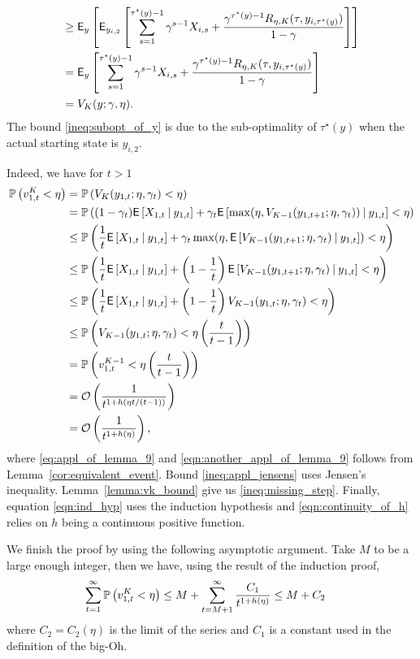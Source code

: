 \begin{myproof}[Proof.]
\begin{myproof}[Proof.]
\begin{align}
		& \ge  \E_y\left[\E_{y_{i,2}}\left[\sum_{s=1}^{\tau^\star(y)-1} \gamma^{s-1} X_{i,s} + \frac{\gamma^{\tau^\star(y)-1} R_{\eta, K}(\tau, y_{i,\tau^\star(y)})}{1-\gamma}\right] \right] \label{ineq:subopt_of_y}\\
		& = \E_y\left[\sum_{s=1}^{\tau^\star(y)-1} \gamma^{s-1} X_{i,s} + \frac{\gamma^{\tau^\star(y)-1} R_{\eta, K}(\tau, y_{i,\tau^\star(y)})}{1-\gamma}\right] \nonumber \\
		& = V_K(y; \gamma, \eta). \nonumber
		\end{align}
		The bound \eqref{ineq:subopt_of_y} is due to the sub-optimality of $\tau^\star(y)$ when the actual starting state is $y_{i,2}$.
	\end{myproof}
	Indeed, we have for $t > 1$
	\begin{align}
	\P{v^K_{1,t} < \eta} & = \P{V_K(y_{1,t}; \eta, \gamma_t) < \eta} \label{eq:appl_of_lemma_9}\\
	& = \P{(1-\gamma_t)\Ee{X_{1,t} \given y_{1,t}} + \gamma_t \Ee{\max(\eta, V_{K-1}(y_{1,t+1}; \eta, \gamma_{t})) \given y_{1,t}}< \eta} \nonumber \\
	& \le \P{\frac{1}{t}\Ee{X_{1,t} \given y_{1,t}} + \gamma_t \max(\eta, \Ee{V_{K-1}(y_{1,t+1}; \eta, \gamma_{t}) \given y_{1,t}})< \eta} \label{ineq:appl_jensens} \\
	& \le \P{\frac{1}{t}\Ee{X_{1,t} \given y_{1,t}} + \left(1-\frac{1}{t}\right) \Ee{V_{K-1}(y_{1,t+1}; \eta, \gamma_{t}) \given y_{1,t} }< \eta} \nonumber \\
	& \le \P{\frac{1}{t}\Ee{X_{1,t} \given y_{1,t}} + \left(1-\frac{1}{t}\right) V_{K-1}(y_{1,t}; \eta, \gamma_{t})< \eta} \label{ineq:missing_step} \\
	& \le \P{ V_{K-1}(y_{1,t}; \eta, \gamma_{t})< \eta \left(\frac{t}{t-1}\right)} \nonumber \\
	&  = \P{v^{K-1}_{1,t} < \eta\left(\frac{t}{t-1}\right)} \label{eqn:another_appl_of_lemma_9} \\
	& = \mathcal{O}\left(\frac{1}{t^{1 + h(\eta t/(t-1))}}\right) \label{eqn:ind_hyp}\\
	& =  \mathcal{O}\left(\frac{1}{t^{1 + h(\eta)}}\right) \label{eqn:continuity_of_h},
	\end{align}
	where \eqref{eq:appl_of_lemma_9} and \eqref{eqn:another_appl_of_lemma_9} follows from Lemma~\ref{cor:equivalent_event}. Bound \eqref{ineq:appl_jensens} uses Jensen's inequality. Lemma~\ref{lemma:vk_bound} give us \eqref{ineq:missing_step}. Finally, equation \eqref{eqn:ind_hyp} uses the induction hypothesis and \eqref{eqn:continuity_of_h} relies on $h$ being a continuous positive function.
	
	We finish the proof by using the following asymptotic argument. Take $M$ to be a large enough integer, then we have, using the result of the induction proof,
	\begin{align*}
	\sum_{t=1}^\infty \P{v^K_{1,t} < \eta} & \le M +  \sum_{t=M+1}^\infty \frac{C_1}{t^{1 + h(\eta)}} \le M +  C_2
	\end{align*}
	where $C_2 = C_2(\eta)$ is the limit of the series and $C_1$ is a constant used in the definition of the big-Oh.
\end{myproof}

